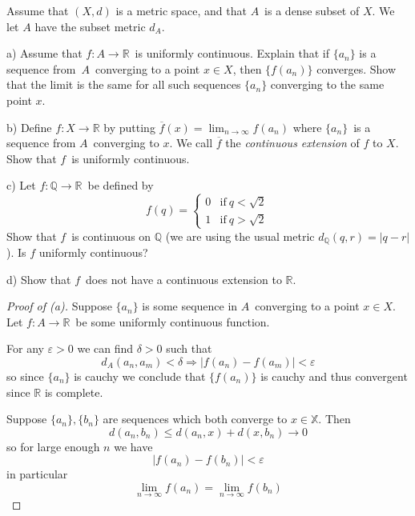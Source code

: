 \begin{prob}
    Assume that $(X,d)$ is a metric space, and that $A$ is a 
    dense subset of $X$. We let $A$ have the subset metric $d_A$.

    a) Assume that $f: A \to \mathbb R$ is uniformly continuous. 
    Explain that if $\{a_n\}$ is a sequence from $A$ converging 
    to a point $x\in X$, then $\{f(a_n)\}$ converges. Show that 
    the limit is the same for all such sequences $\{a_n\}$ converging
    to the same point $x$. 

    b) Define $f: X \to \mathbb R$ by putting $\overline f(x) = 
    \lim_{n\to\infty}f(a_n)$ where $\{a_n\}$ is a sequence from 
    $A$ converging to $x$. We call $\overline f$ the \emph{continuous 
    extension} of $f$ to $X$. Show that $f$ is uniformly continuous.

    c) Let $f:\mathbb Q \to \mathbb R$ be defined by 
    \[
        f(q) = 
        \begin{cases}
            0 & \text{if} \ q < \sqrt 2 \\ 
            1 & \text{if} \ q > \sqrt 2
        \end{cases}
    \]
    Show that $f$ is continuous on $\mathbb Q$ (we are using the 
    usual metric $d_{\mathbb Q}(q,r) = |q-r|$). Is $f$ uniformly 
    continuous? 

    d) Show that $f$ does not have a continuous extension to 
    $\mathbb R$.
\end{prob}
\begin{proof}[Proof of (a)]
    Suppose $\{a_n\}$ is some sequence in $A$ converging to a 
    point $x \in X$. Let $f: A \to \mathbb R$ be some uniformly 
    continuous function. 

    For any $\varepsilon > 0$ we can find $\delta > 0$ such that 
    \[
        d_A(a_n, a_m) < \delta \Rightarrow |f(a_n) - f(a_m)| <  
        \varepsilon
    \]
    so since $\{a_n\}$ is cauchy we conclude that $\{f(a_n)\}$ is 
    cauchy and thus convergent since $\mathbb R$ is complete.

    Suppose $\{a_n\},\{b_n\}$ are sequences which both 
    converge to $x \in \mathbb X$. Then 
    \[
        d(a_n,b_n) \leq d(a_n,x) + d(x,b_n) \to 0
    \]
    so for large enough $n$ we have 
    \[
        |f(a_n) - f(b_n)| < \varepsilon
    \]
    in particular 
    \[
        \lim_{n\to\infty}f(a_n) = \lim_{n\to\infty}f(b_n)
    \]
\end{proof} 
